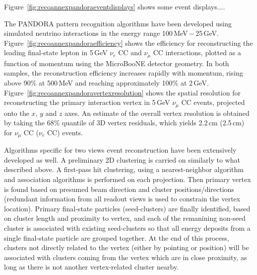 
Figure~\ref{fig:recoannexpandoraeventdisplays} shows some event displays....

The PANDORA pattern recognition algorithms have been developed
using simulated neutrino interactions in the energy range 100\,MeV\,$-$\,25\,GeV.
Figure~\ref{fig:recoannexpandoraefficiency} shows the efficiency for reconstructing
the leading final-state lepton in 5\,GeV $\nu_{e}$ CC and $\nu_{\mu}$ CC interactions,
plotted as a function of momentum using the MicroBooNE detector geometry.
In both samples, the reconstruction efficiency increases rapidly with momentum,
rising above 90\% at 500\,MeV and reaching approximately 100\% at 2\,GeV.
Figure~\ref{fig:recoannexpandoravertexresolution} shows the spatial resolution for
reconstructing the primary interaction vertex in 5\,GeV $\nu_{\mu}$ CC events,
projected onto the $x$, $y$ and $z$ axes. An estimate of the overall vertex 
resolution is obtained by taking the 68\% quantile of 3D vertex residuals, 
which yields 2.2\,cm (2.5\,cm) for $\nu_{\mu}$ CC ($\nu_{e}$ CC) events.



Algorithms specific for two views event reconstruction have been extensively developed as well. 
A preliminary 2D clustering is carried on similarly to what described above.
A first-pass hit clustering, using a nearest-neighbor algorithm and association algorithms is performed
on each projection. Then primary vertex is found based on presumed beam direction and cluster positions/directions
(redundant information from all readout views is used to constrain the vertex location).
Primary final-state particles (seed-clusters) are finally identified, based on cluster length and proximity to vertex,
and each of the remanining non-seed cluster is associated with existing seed-clusters so that all energy deposits from a single final-state particle are grouped together.
At the end of this process, clusters not directly related to the vertex (either by pointing or position) 
will be associated with clusters coming from the vertex which are in close proximity, 
as long as there is not another vertex-related cluster nearby. 

